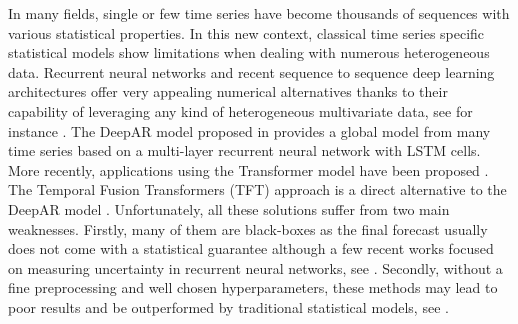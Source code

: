 \documentclass[10pt]{article} %
\begin{document}
In many fields, single or few time series have become thousands of sequences with various statistical properties. In this new context, classical time series specific statistical models show limitations when dealing with numerous heterogeneous data. Recurrent neural networks and recent sequence to sequence deep learning architectures offer very appealing numerical alternatives thanks to their capability of leveraging any kind of heterogeneous multivariate data, see for instance \citet{ hochreiter1997,vaswani2017, siami2018, li2019, lim2019,salinas2020}. The DeepAR model proposed in \citet{salinas2020} provides a global model from many time series based on a multi-layer recurrent neural network with LSTM cells. More recently, applications using the Transformer model have been proposed  \citep{li2019}. The Temporal Fusion Transformers (TFT) approach is a direct alternative to the DeepAR model \citep{lim2019}.  Unfortunately, all these solutions suffer from two main weaknesses. Firstly, many of them are black-boxes  as the final forecast usually does not come with a statistical guarantee  although a few recent works focused on measuring uncertainty in recurrent neural networks, see  \citet{martin2020}. Secondly, without a fine preprocessing and well chosen hyperparameters, these methods may lead to poor results and be outperformed by traditional statistical models, see \citet{makridakis2018}.
\end{document}
